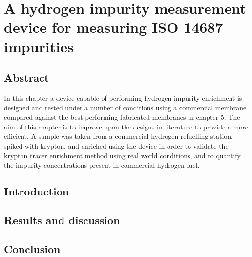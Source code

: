 \chapter{A hydrogen impurity measurement device for measuring ISO 14687 impurities}

\section{Abstract}
In this chapter a device capable of performing hydrogen impurity enrichment is designed and tested under a number of conditions using a commercial membrane compared against the best performing fabricated membranes in chapter 5. The aim of this chapter is to improve upon the designs in literature to provide a more efficient, A sample was taken from a commercial hydrogen refuelling station, spiked with krypton, and enriched using the device in order to validate the krypton tracer enrichment method using real world conditions, and to quantify the impurity concentrations present in commercial hydrogen fuel. 

\section{Introduction}

\section{Results and discussion}

\section{Conclusion}
% 
% 